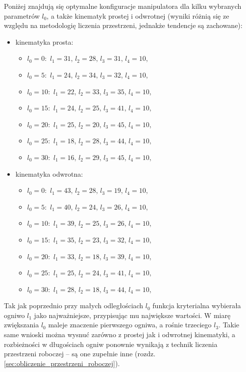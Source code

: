 \documentclass[printmode]{mgr}
\begin{document}
Poniżej znajdują się optymalne konfiguracje manipulatora dla kilku wybranych parametrów $l_0$, a także kinematyk prostej i odwrotnej
(wyniki różnią się ze względu na metodologię liczenia przestrzeni, jednakże tendencje są zachowane):
\begin{itemize}
\item kinematyka prosta:
\begin{itemize}
\item $l_0=0:$ $l_1=31$, $l_2=28$, $l_3=31$, $l_4=10$,
\item $l_0=5:$ $l_1=24$, $l_2=34$, $l_3=32$, $l_4=10$,
\item $l_0=10:$ $l_1=22$, $l_2=33$, $l_3=35$, $l_4=10$,
\item $l_0=15:$ $l_1=24$, $l_2=25$, $l_3=41$, $l_4=10$,
\item $l_0=20:$ $l_1=25$, $l_2=20$, $l_3=45$, $l_4=10$,
\item $l_0=25:$ $l_1=18$, $l_2=28$, $l_3=44$, $l_4=10$,
\item $l_0=30:$ $l_1=16$, $l_2=29$, $l_3=45$, $l_4=10$,
\end{itemize}
\item kinematyka odwrotna:
\begin{itemize}
\item $l_0=0:$ $l_1=43$, $l_2=28$, $l_3=19$, $l_4=10$,
\item $l_0=5:$ $l_1=40$, $l_2=24$, $l_3=26$, $l_4=10$,
\item $l_0=10:$ $l_1=39$, $l_2=25$, $l_3=26$, $l_4=10$,
\item $l_0=15:$ $l_1=35$, $l_2=23$, $l_3=32$, $l_4=10$,
\item $l_0=20:$ $l_1=33$, $l_2=18$, $l_3=39$, $l_4=10$,
\item $l_0=25:$ $l_1=25$, $l_2=24$, $l_3=41$, $l_4=10$,
\item $l_0=30:$ $l_1=28$, $l_2=18$, $l_3=44$, $l_4=10$,
\end{itemize}
\end{itemize}

Tak jak poprzednio przy małych odległościach $l_0$ funkcja kryterialna wybierała ogniwo $l_1$ jako najważniejsze, przypisując mu
największe wartości. W miarę zwiększania $l_0$ maleje znaczenie pierwszego ogniwa, a rośnie trzeciego $l_3$. Takie same wnioski
można wysnuć zarówno z prostej jak i odwrotnej kinematyki, a rozbieżności w długościach ogniw ponownie wynikają z technik liczenia przestrzeni
roboczej -- są one zupełnie inne (rozdz. \ref{sec:obliczenie_przestrzeni_roboczej}).
\end{document}
